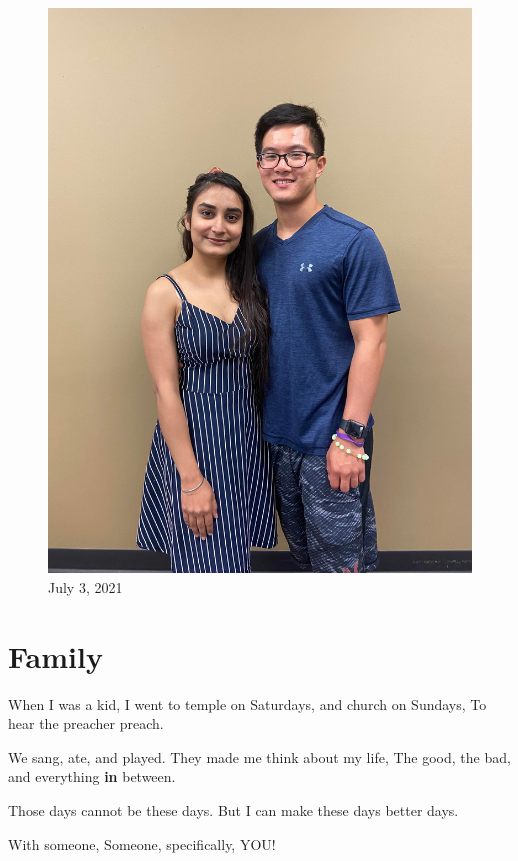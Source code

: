 \documentclass[
]{book}
\newenvironment{Shaded}{\begin{snugshade}}{\end{snugshade}}
\newcommand{\ControlFlowTok}[1]{\textcolor[rgb]{0.13,0.29,0.53}{\textbf{#1}}}
\newcommand{\NormalTok}[1]{#1}
\newcommand{\SpecialCharTok}[1]{\textcolor[rgb]{0.00,0.00,0.00}{#1}}
\begin{document}
\begin{figure}
\centering
\includegraphics[width=5.20833in,height=\textheight]{mimages/11.1 7-3-2021.jpg}
\caption{July 3, 2021}
\end{figure}

\hypertarget{family}{%
\chapter{Family}\label{family}}

\begin{Shaded}
\begin{Highlighting}[]
\NormalTok{When I was a kid,}
\NormalTok{I went to temple on Saturdays,}
\NormalTok{and church on Sundays,}
\NormalTok{To hear the preacher preach.}

\NormalTok{We sang, ate, and played.}
\NormalTok{They made me think about my life,}
\NormalTok{The good, the bad,}
\NormalTok{and everything }\ControlFlowTok{in}\NormalTok{ between.}

\NormalTok{Those days cannot be}
\NormalTok{these days.}
\NormalTok{But I can make these days}
\NormalTok{better days.}

\NormalTok{With someone,}
\NormalTok{Someone,}
\NormalTok{specifically,}
\NormalTok{YOU}\SpecialCharTok{!}
\end{Highlighting}
\end{Shaded}
\end{document}
